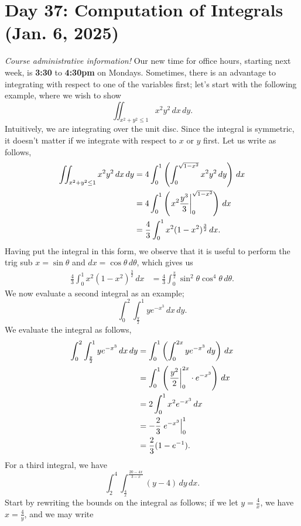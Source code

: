 \section{Day 37: Computation of Integrals (Jan. 6, 2025)}
\textit{Course administrative information!} Our new time for office hours, starting next week, is \textbf{3:30} to \textbf{4:30pm} on Mondays.
\medskip\newline
\noindent Sometimes, there is an advantage to integrating with respect to one of the variables first; let's start with the following example, where we wish to show
\[ \iint_{x^2 + y^2 \leq 1} x^2y^2 \, dx \, dy. \tag{1} \]
Intuitively, we are integrating over the unit disc. Since the integral is symmetric, it doesn't matter if we integrate with respect to $x$ or $y$ first. Let us write as follows,
\begin{align*}
    \iint_{x^2 + y^2 \leq 1} x^2y^2 \, dx \, dy &= 4 \int_0^1 \left( \int_0^{\sqrt{1 - x^2}} x^2y^2 \, dy \right) \, dx \\
    &= 4 \int_0^1 \left( \left.x^2 \frac{y^3}{3}\right\rvert_{0}^{\sqrt{1-x^2}} \right) \, dx \\
    &= \frac{4}{3} \int_0^1 x^2 (1 - x^2)^{\frac{3}{2}} \, dx.
\end{align*}
Having put the integral in this form, we observe that it is useful to perform the trig sub $x = \sin \theta$ and $dx = \cos \theta \, d \theta$, which gives us
\begin{align*}
    \frac{4}{3} \int_0^1 x^2 (1 - x^2)^{\frac{3}{2}} \, dx &= \frac{4}{3} \int_0^{\frac{\pi}{2}} \sin^2 \theta \cos^4 \theta \, d\theta.
\end{align*}
We now evaluate a second integral as an example;
\[ \int_0^2 \int_{\frac{y}{2}}^1 ye^{-x^3} \, dx \, dy. \tag{2} \]
We evaluate the integral as follows,
\begin{align*}
    \int_0^2 \int_{\frac{y}{2}}^1 ye^{-x^3} \, dx \, dy &= \int_0^1 \left(\int_0^{2x} ye^{-x^3} \, dy \right) \, dx \\
    &= \int_0^1 \left(\left.\frac{y^2}{2}\right\rvert_{0}^{2x} \cdot e^{-x^3} \right) \, dx \\
    &= 2 \int_0^1 x^2 e^{-x^3} \, dx \\
    &= -\frac{2}{3} \left.e^{-x^3}\right\rvert_{0}^{1} \\
    &= \frac{2}{3} (1-e^{-1}).
\end{align*}
For a third integral, we have
\[ \int_2^4 \int_{\frac{4}{x}}^{\frac{20 - 4x}{3 - x}} (y - 4) \, dy \, dx. \tag{3} \]
Start by rewriting the bounds on the integral as follows; if we let $y = \frac{4}{x}$, we have $x = \frac{4}{y}$, and we may write

